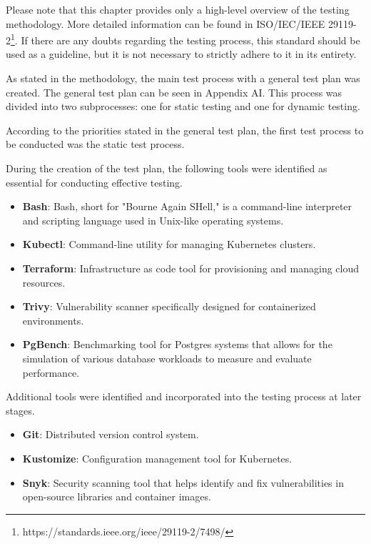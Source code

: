 Please note that this chapter provides only a high-level overview of the testing methodology. More detailed information can be found in ISO/IEC/IEEE 29119-2\footnote[5]{https://standards.ieee.org/ieee/29119-2/7498/}. If there are any doubts regarding the testing process, this standard should be used as a guideline, but it is not necessary to strictly adhere to it in its entirety.

\label{chap:testProces}
As stated in the methodology, the main test process with a general test plan was created. The general test plan can be seen in Appendix AI. This process was divided into two subprocesses: one for static testing and one for dynamic testing.

According to the priorities stated in the general test plan, the first test process to be conducted was the static test process.


During the creation of the test plan, the following tools were identified as essential for conducting effective testing.
\begin{itemize}
    \item \textbf{Bash}: Bash, short for "Bourne Again SHell," is a command-line interpreter and scripting language used in Unix-like operating systems.
    \item \textbf{Kubectl}: Command-line utility for managing Kubernetes clusters.
    \item \textbf{Terraform}: Infrastructure as code tool for provisioning and managing cloud resources.
    \item \textbf{Trivy}: Vulnerability scanner specifically designed for containerized environments.
    \item \textbf{PgBench}: Benchmarking tool for Postgres systems that allows for the simulation of various database workloads to measure and evaluate performance.
\end{itemize}

Additional tools were identified and incorporated into the testing process at later stages.
\begin{itemize}
    \item \textbf{Git}: Distributed version control system.
    \item \textbf{Kustomize}: Configuration management tool for Kubernetes.
    \item \textbf{Snyk}: Security scanning tool that helps identify and fix vulnerabilities in open-source libraries and container images.
\end{itemize}

